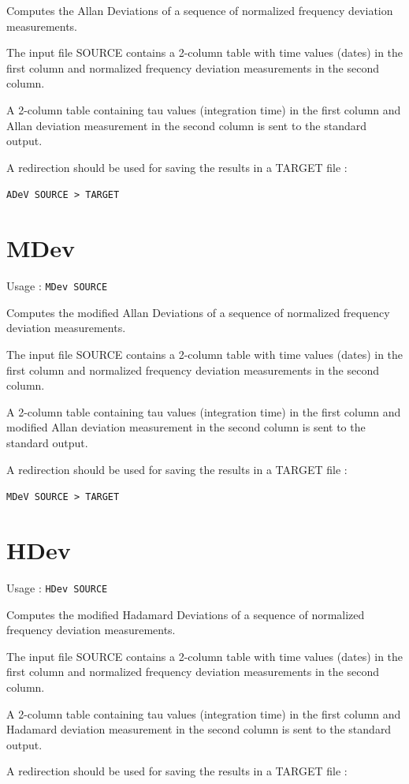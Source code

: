 \documentclass[10pt,a4paper,french]{article}
\begin{document}
Computes the Allan Deviations of a sequence of normalized frequency deviation measurements.

The input file SOURCE contains a 2-column table with time values (dates) in the first column and normalized frequency deviation measurements in the second column.

A 2-column table containing tau values (integration time) in the first column and Allan deviation measurement in the second column is sent to the standard output.

A redirection should be used for saving the results in a TARGET file : 

{\tt{ADeV SOURCE > TARGET}}

\section{MDev}

Usage : {\tt{MDev SOURCE}}

Computes the modified Allan Deviations of a sequence of normalized frequency deviation measurements.

The input file SOURCE contains a 2-column table with time values (dates) in the first column and normalized frequency deviation measurements in the second column.

A 2-column table containing tau values (integration time) in the first column and modified Allan deviation measurement in the second column is sent to the standard output.

A redirection should be used for saving the results in a TARGET file : 

{\tt{MDeV SOURCE > TARGET}}

\section{ HDev}

Usage : {\tt{HDev SOURCE}}

Computes the modified Hadamard Deviations of a sequence of normalized frequency deviation measurements.

The input file SOURCE contains a 2-column table with time values (dates) in the first column and normalized frequency deviation measurements in the second column.

A 2-column table containing tau values (integration time) in the first column and Hadamard deviation measurement in the second column is sent to the standard output.

A redirection should be used for saving the results in a TARGET file : 
\end{document}
